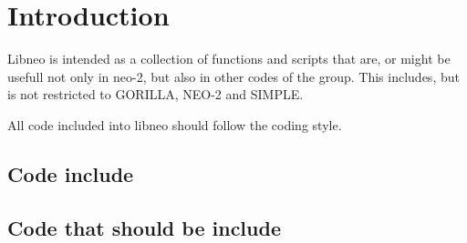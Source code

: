 \chapter{Introduction}
Libneo is intended as a collection of functions and scripts that are, or
might be usefull not only in neo-2, but also in other codes of the
group.
This includes, but is not restricted to GORILLA, NEO-2 and SIMPLE.

All code included into libneo should follow the coding style.

\section{Code include}

\section{Code that should be include}
